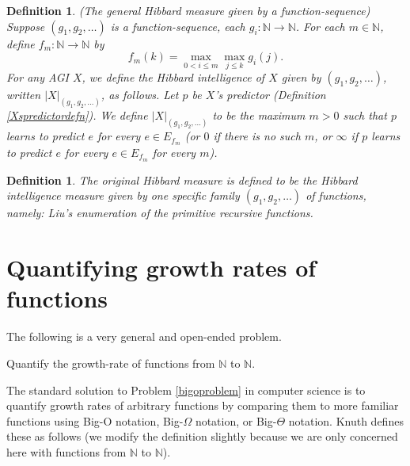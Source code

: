 \documentclass{article}
\newtheorem{definition}[theorem]{Definition}
\begin{document}
\begin{definition}
\label{generalintelligencemeasuredefn}
    (The general Hibbard measure given by a function-sequence)
    Suppose $(g_1,g_2,\ldots)$ is a function-sequence,
    each $g_i:\mathbb N\to\mathbb N$.
    For each $m\in\mathbb N$, define $f_m:\mathbb N\to\mathbb N$ by
    \[f_m(k)=\max_{0<i\leq m}\max_{j\leq k}g_i(j).\]
    For any AGI $X$, we define the \emph{Hibbard intelligence of $X$
    given by $(g_1,g_2,\ldots)$}, written $|X|_{(g_1,g_2,\ldots)}$, as follows.
    Let $p$ be $X$'s predictor (Definition \ref{Xspredictordefn}).
    We define $|X|_{(g_1,g_2,\ldots)}$ to be the maximum $m>0$
    such that $p$ learns to predict $e$ for every $e\in E_{f_m}$
    (or $0$ if there is no such $m$, or $\infty$ if $p$ learns to predict $e$
    for every $e\in E_{f_m}$ for every $m$).
\end{definition}

\begin{definition}
\label{classichibbardmeasuredefn}
    The \emph{original Hibbard measure} is defined to be the Hibbard intelligence
    measure given by one specific family $(g_1,g_2,\ldots)$ of functions, namely:
    Liu's \cite{liu1960enumeration} enumeration of the primitive recursive
    functions.
\end{definition}


\section{Quantifying growth rates of functions}
\label{growthratesection}

The following is a very general and open-ended problem.

\begin{problem}
\label{bigoproblem}
    Quantify the growth-rate of functions from $\mathbb N$ to $\mathbb N$.
\end{problem}

The standard solution to Problem \ref{bigoproblem} in computer science is to quantify
growth rates of arbitrary functions by comparing them to more familiar functions using
Big-O notation, Big-$\Omega$ notation, or Big-$\Theta$ notation.
Knuth defines \cite{knuth1976big} these as follows (we modify the definition slightly because
we are only concerned here with functions from $\mathbb N$ to $\mathbb N$).
\end{document}
